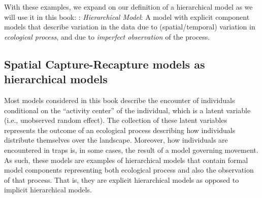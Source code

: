 With these examples,
we expand on our definition of a hierarchical model as we will use it
in this book: \newline
{: {\it Hierarchical Model}: A model with
  explicit component models that describe variation in the data due to
  (spatial/temporal) variation in {\it ecological process}, and due to
  {\it imperfect observation} of the process.
}














\subsection{Spatial Capture-Recapture models as hierarchical models}

Most models considered in this book describe the encounter of
individuals conditional on the ``activity center'' of the individual,
which is a latent variable (i.e., unobserved random effect).  The
collection of these latent variables represents the outcome of an
ecological process describing how individuals distribute themselves
over the landscape. Moreover, how individuals are encountered in traps
is, in some cases, the result of a model governing movement.  As such,
these models are examples of hierarchical models that contain formal
model components representing both ecological process and also the
observation of that process. That is, they are explicit hierarchical
models \citep{royle_dorazio:2008} as opposed to implicit hierarchical
models.





